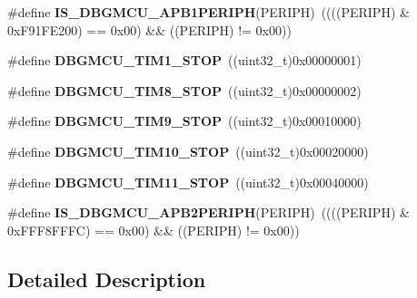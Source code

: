 \begin{DoxyCompactItemize}
\item 
\hypertarget{group___d_b_g_m_c_u___exported___constants_ga10783f4e13d74c8a7516587e8d9cdcac}{}\#define {\bfseries I\+S\+\_\+\+D\+B\+G\+M\+C\+U\+\_\+\+A\+P\+B1\+P\+E\+R\+I\+P\+H}(P\+E\+R\+I\+P\+H)~((((P\+E\+R\+I\+P\+H) \& 0x\+F91\+F\+E200) == 0x00) \&\& ((\+P\+E\+R\+I\+P\+H) != 0x00))\label{group___d_b_g_m_c_u___exported___constants_ga10783f4e13d74c8a7516587e8d9cdcac}

\item 
\hypertarget{group___d_b_g_m_c_u___exported___constants_ga017fb3101a3569426e82b066cb2f8848}{}\#define {\bfseries D\+B\+G\+M\+C\+U\+\_\+\+T\+I\+M1\+\_\+\+S\+T\+O\+P}~((uint32\+\_\+t)0x00000001)\label{group___d_b_g_m_c_u___exported___constants_ga017fb3101a3569426e82b066cb2f8848}

\item 
\hypertarget{group___d_b_g_m_c_u___exported___constants_gaa66feea7d5f2c253fe3f431f9dd4bd1e}{}\#define {\bfseries D\+B\+G\+M\+C\+U\+\_\+\+T\+I\+M8\+\_\+\+S\+T\+O\+P}~((uint32\+\_\+t)0x00000002)\label{group___d_b_g_m_c_u___exported___constants_gaa66feea7d5f2c253fe3f431f9dd4bd1e}

\item 
\hypertarget{group___d_b_g_m_c_u___exported___constants_ga560c557a0d0839dba04f7f2b47851109}{}\#define {\bfseries D\+B\+G\+M\+C\+U\+\_\+\+T\+I\+M9\+\_\+\+S\+T\+O\+P}~((uint32\+\_\+t)0x00010000)\label{group___d_b_g_m_c_u___exported___constants_ga560c557a0d0839dba04f7f2b47851109}

\item 
\hypertarget{group___d_b_g_m_c_u___exported___constants_ga1f0ae2f78e1f9d7eb819bf49b13b5327}{}\#define {\bfseries D\+B\+G\+M\+C\+U\+\_\+\+T\+I\+M10\+\_\+\+S\+T\+O\+P}~((uint32\+\_\+t)0x00020000)\label{group___d_b_g_m_c_u___exported___constants_ga1f0ae2f78e1f9d7eb819bf49b13b5327}

\item 
\hypertarget{group___d_b_g_m_c_u___exported___constants_gade03e5368c3bf8a2f43fc046f1d87f30}{}\#define {\bfseries D\+B\+G\+M\+C\+U\+\_\+\+T\+I\+M11\+\_\+\+S\+T\+O\+P}~((uint32\+\_\+t)0x00040000)\label{group___d_b_g_m_c_u___exported___constants_gade03e5368c3bf8a2f43fc046f1d87f30}

\item 
\hypertarget{group___d_b_g_m_c_u___exported___constants_ga3ed84495007a409cad90734040be900e}{}\#define {\bfseries I\+S\+\_\+\+D\+B\+G\+M\+C\+U\+\_\+\+A\+P\+B2\+P\+E\+R\+I\+P\+H}(P\+E\+R\+I\+P\+H)~((((P\+E\+R\+I\+P\+H) \& 0x\+F\+F\+F8\+F\+F\+F\+C) == 0x00) \&\& ((\+P\+E\+R\+I\+P\+H) != 0x00))\label{group___d_b_g_m_c_u___exported___constants_ga3ed84495007a409cad90734040be900e}

\end{DoxyCompactItemize}


\subsection{Detailed Description}
